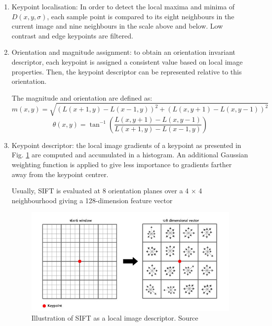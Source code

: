 \begin{enumerate}
    \item Keypoint localisation: In order to detect the local maxima and minima of $D(x, y,\sigma)$, each sample point is compared to its eight neighbours in the current image and nine neighbours in the scale above and below. Low contrast and edge keypoints are filtered.
    
    \item Orientation and magnitude assignment: to obtain an orientation invariant descriptor, each keypoint is assigned a consistent value based on local image properties. Then, the keypoint descriptor can be represented relative to this orientation.
    
    The magnitude and orientation are defined as:
    $$
    m(x, y) = \sqrt{ \left( L(x +1, y) - L(x -1, y)  \right)^2 + \left( L(x, y + 1) - L(x, y - 1) \right)^2}
    $$
    $$
    \theta(x, y) =\tan^{-1} ( \frac{L(x, y + 1) - L(x, y - 1 )}{L(x + 1, y) - L(x - 1, y)} )
    $$
    
    \item Keypoint descriptor: the local image gradients of a keypoint as presented in Fig. \ref{fig:sift_descriptor} are computed and accumulated in a histogram. An additional Gaussian weighting function is applied to give less importance to gradients farther away from the keypoint centrer.
    
    Usually, SIFT is evaluated at 8 orientation planes over a 4 × 4 neighbourhood giving a
    128-dimension feature vector
    
    \begin{figure}[h]
        \centering
        \includegraphics[scale=0.5]{img/sift_descriptor.jpg}
        \caption[Illustration of SIFT as a local image descriptor]{Illustration of SIFT as a local image descriptor. Source \cite{Lowe2004}}
        \label{fig:sift_descriptor}
    \end{figure}
\end{enumerate}


